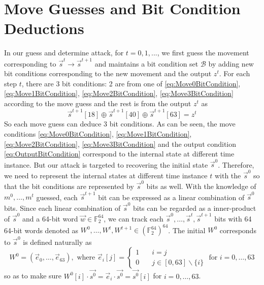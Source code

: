 \section{Move Guesses and Bit Condition Deductions}\label{sec:OurGuessAndDetermine}
In our guess and determine attack, for $t=0,1,...$, we first guess the movement corresponding to $\vec{s}^t\rightarrow \vec{s}^{t+1}$ and maintains a bit condition set $\mathcal{B}$ by adding new bit conditions corresponding to the new movement and the output $z^t$.
For each step $t$, there are 3 bit conditions: 2 are from one of \eqref{eq:Move0BitCondition}, \eqref{eq:Move1BitCondition}, \eqref{eq:Move2BitCondition}, \eqref{eq:Move3BitCondition} according to the move guess and the rest is from the output $z^t$ as
\begin{equation}\label{eq:OutputBitCondition}
\vec{s}^{t+1}[18]\oplus \vec{s}^{t+1}[40]\oplus \vec{s}^{t+1}[63]=z^t
\end{equation}
So each move guess can deduce 3 bit conditions.
As can be seen, the move conditions \eqref{eq:Move0BitCondition}, \eqref{eq:Move1BitCondition}, \eqref{eq:Move2BitCondition}, \eqref{eq:Move3BitCondition} and the output condition \eqref{eq:OutputBitCondition} correspond to the internal state at different time instance.
But our attack is targeted to recovering the initial state $\vec{s}^0$.
Therefore, we need to represent the internal states at different time instance $t$ with the $\vec{s}^0$ so that the bit conditions are represented by $\vec{s}^0$ bits as well.
With the knowledge of $m^0,\ldots, m^t$ guessed, each $\vec{s}^{t+1}$ bit can be expressed as a linear combination of $\vec{s}^0$ bits.
Since each linear combination of $\vec{s}^0$ bits can be regarded as a inner-product of $\vec{s}^0$ and a 64-bit word $\vec w\in \mathbb{F}_2^{64}$, we can track each $\vec{s}^0,\ldots, \vec{s}^t, \vec{s}^{t+1}$ bits with 64 64-bit words denoted as $W^0,\ldots, W^t, W^{t+1}\in (\mathbb{F}_2^{64})^{64}$.
The initial $W^0$ corresponds to $\vec{s}^0$ is defined naturally as
\begin{equation}\label{eq:W0ofS0}
  W^0=(\vec e_0, \ldots, \vec e_{63}), \text{ where } \vec e_i[j]=\left\{
  \begin{split}
     1 &\quad i=j \\
     0 &\quad j\in [0,63]\backslash\{i\}
  \end{split}
  \right.\text{ for }i=0,\ldots, 63
\end{equation}
so as to make sure $W^0[i]\cdot \vec{s^0}=\vec{e}_i\cdot \vec{s^0}=\vec{s^0}[i]$ for $i=0,\ldots, 63$.
